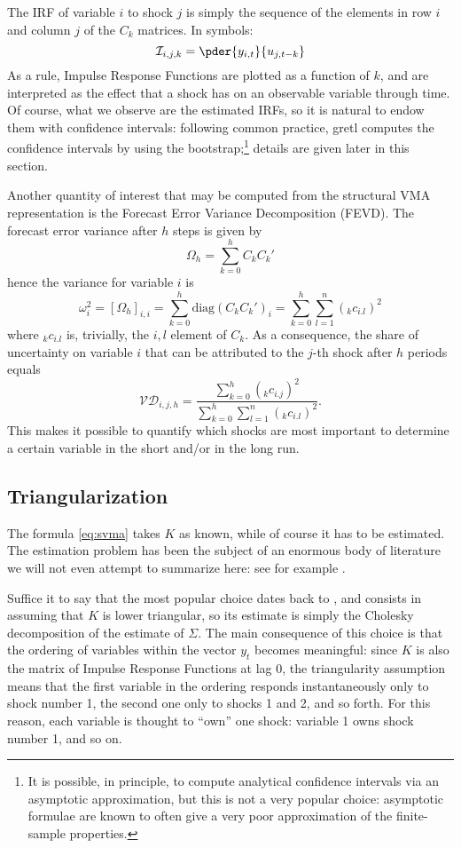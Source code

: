 The IRF of variable $i$ to shock $j$ is simply the sequence of the
elements in row $i$ and column $j$ of the $C_k$ matrices. In symbols:
\[
  \mathcal{I}_{i,j,k} = \pder{y_{i,t}}{u_{j, t-k}}
\]
As a rule, Impulse Response Functions are plotted as a function of
$k$, and are interpreted as the effect that a shock has on an
observable variable through time. Of course, what we observe are the
estimated IRFs, so it is natural to endow them with confidence
intervals: following common practice, gretl computes the
confidence intervals by using the bootstrap;\footnote{It is possible,
  in principle, to compute analytical confidence intervals via an
  asymptotic approximation, but this is not a very popular choice:
  asymptotic formulae are known to often give a very poor
  approximation of the finite-sample properties.} details are given
later in this section.

Another quantity of interest that may be computed from the structural
VMA representation is the Forecast Error Variance Decomposition
(FEVD). The forecast error variance after $h$ steps is given by
\[
  \Omega_h = \sum_{k=0}^h C_k C_k'
\]
hence the variance for variable $i$ is
\[
  \omega^2_i = \left[ \Omega_h \right]_{i,i} = \sum_{k=0}^h
  \mathrm{diag}(C_k C_k')_i =
  \sum_{k=0}^h \sum_{l=1}^n ({}_kc_{i.l})^2 
\]
where ${}_kc_{i.l}$ is, trivially, the $i,l$ element of $C_k$. As a
consequence, the share of uncertainty on variable $i$ that can be
attributed to the $j$-th shock after $h$ periods equals
\[
  \mathcal{VD}_{i,j,h} =
  \frac{\sum_{k=0}^h ({}_kc_{i.j})^2 }{  \sum_{k=0}^h \sum_{l=1}^n
    ({}_kc_{i.l})^2 } .
\]
This makes it possible to quantify which shocks are most important to
determine a certain variable in the short and/or in the long run.

\subsection{Triangularization}

The formula \ref{eq:svma} takes $K$ as known, while of course it has
to be estimated. The estimation problem has been the subject of an
enormous body of literature we will not even attempt to summarize
here: see for example \cite[chapter 9]{Lutkepohl05}.

Suffice it to say that the most popular choice dates back to
\cite{sims80}, and consists in assuming that $K$ is lower triangular,
so its estimate is simply the Cholesky decomposition of the estimate
of $\Sigma$. The main consequence of this choice is that the ordering
of variables within the vector $y_t$ becomes meaningful: since $K$ is
also the matrix of Impulse Response Functions at lag 0, the
triangularity assumption means that the first variable in the ordering
responds instantaneously only to shock number 1, the second one only
to shocks 1 and 2, and so forth. For this reason, each variable is
thought to ``own'' one shock: variable 1 owns shock number 1,
and so on.

